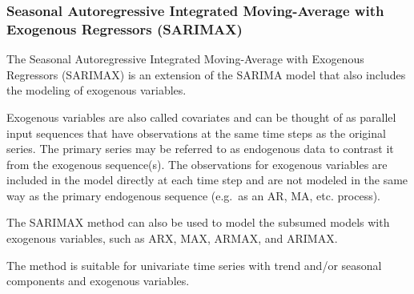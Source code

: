 \documentclass[11pt]{article}
\begin{document}
    \hypertarget{seasonal-autoregressive-integrated-moving-average-with-exogenous-regressors-sarimax}{%
\subsubsection{Seasonal Autoregressive Integrated Moving-Average with
Exogenous Regressors
(SARIMAX)}\label{seasonal-autoregressive-integrated-moving-average-with-exogenous-regressors-sarimax}}

The Seasonal Autoregressive Integrated Moving-Average with Exogenous
Regressors (SARIMAX) is an extension of the SARIMA model that also
includes the modeling of exogenous variables.

Exogenous variables are also called covariates and can be thought of as
parallel input sequences that have observations at the same time steps
as the original series. The primary series may be referred to as
endogenous data to contrast it from the exogenous sequence(s). The
observations for exogenous variables are included in the model directly
at each time step and are not modeled in the same way as the primary
endogenous sequence (e.g.~as an AR, MA, etc. process).

The SARIMAX method can also be used to model the subsumed models with
exogenous variables, such as ARX, MAX, ARMAX, and ARIMAX.

The method is suitable for univariate time series with trend and/or
seasonal components and exogenous variables.
\end{document}
